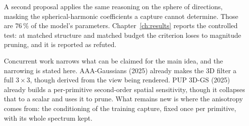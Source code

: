 A second proposal applies the same reasoning on the sphere of directions,
masking the spherical-harmonic coefficients a capture cannot determine. Those are $76\,\%$ of the model's parameters. Chapter~\ref{ch:results} reports
the controlled test: at matched structure and matched budget the criterion loses
to magnitude pruning, and it is reported as refuted.

Concurrent work narrows what can be claimed for the main idea, and the narrowing
is stated here. AAA-Gaussians (2025) already makes the 3D filter a full
$3\times3$, though derived from the view being rendered. PUP 3D-GS (2025)
already builds a per-primitive second-order spatial sensitivity, though it
collapses that to a scalar and uses it to prune. What remains new is where the
anisotropy comes from: the conditioning of the training capture, fixed once per
primitive, with its whole spectrum kept.
